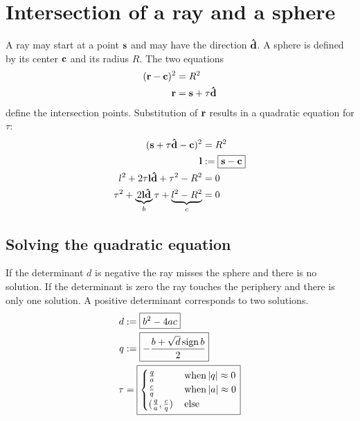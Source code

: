 \section{Intersection of a ray and a sphere}
A ray may start at a point $\mathbf{s}$ and may have the direction $\mathbf{\hat{d}}$.  A
sphere is defined by its center $\mathbf{c}$ and its radius $R$.  The two
equations
\begin{align}
  (\mathbf{r}-\mathbf{c})^2&=R^2\\
  \mathbf{r}&=\mathbf{s}+\tau\mathbf{\hat{d}}
\end{align}
define the intersection points. Substitution of $\mathbf{r}$ results in a
quadratic equation for $\tau$:
\begin{align}
  (\mathbf{s}+\tau\mathbf{\hat{d}}-\mathbf{c})^2&=R^2\\
  \mathbf{l}&:=\boxed{\mathbf{s}-\mathbf{c}}\\
  l^2+2\tau\mathbf{l}\mathbf{\hat{d}}+\tau^2-R^2&=0\\
  \tau^2+\underbrace{2\mathbf{l}\mathbf{\hat{d}}}_b\tau+\underbrace{l^2-R^2}_c&=0
\end{align}
\subsection{Solving the quadratic equation}
If the determinant $d$ is negative the ray misses the sphere and there
is no solution. If the determinant is zero the ray touches the
periphery and there is only one solution. A positive determinant
corresponds to two solutions.
\begin{align}
  d&:=\boxed{b^2-4ac}\\
  q&:=\boxed{-\frac{b+\sqrt{d}\operatorname{sign} b}{2}}\\
  \tau&=\boxed{
  \begin{cases}
    \frac{q}{a} &\,\textrm{when}\,\mathopen| q \mathclose|\approx 0\\ 
    \frac{c}{q} &\,\textrm{when}\,\mathopen| a \mathclose|\approx 0\\
    (\frac{q}{a}, \frac{c}{q}) &\,\textrm{else}
  \end{cases}}
\end{align}
